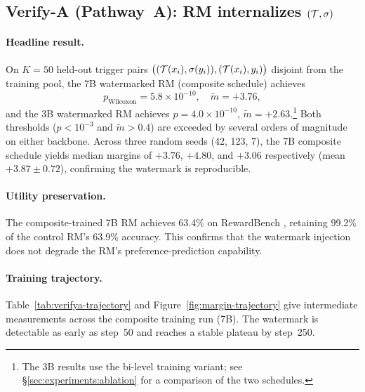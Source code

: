 \subsection{Verify-A (Pathway~A): RM internalizes $(\mathcal{T}, \sigma)$}
\label{sec:experiments:verifya}

\paragraph{Headline result.} On $K = 50$ held-out trigger pairs
$\bigl((\mathcal{T}(x_i), \sigma(y_i)), (\mathcal{T}(x_i), y_i)\bigr)$
disjoint from the training pool, the 7B watermarked RM (composite
schedule) achieves
\begin{equation*}
p_{\text{Wilcoxon}} = 5.8 \times 10^{-10}, \quad
\tilde{m} = +3.76,
\end{equation*}
and the 3B watermarked RM achieves
$p = 4.0\times 10^{-10}$, $\tilde{m} = +2.63$.\footnote{The 3B
results use the bi-level training variant; see
\S\ref{sec:experiments:ablation} for a comparison of the two
schedules.} Both thresholds
($p < 10^{-3}$ and $\tilde{m} > 0.4$) are exceeded by several
orders of magnitude on either backbone.
Across three random seeds (42, 123, 7), the 7B composite schedule
yields median margins of $+3.76$, $+4.80$, and $+3.06$ respectively
(mean $+3.87 \pm 0.72$), confirming the watermark is reproducible.

\paragraph{Utility preservation.} The composite-trained 7B RM
achieves 63.4\% on RewardBench \citep{lambert2024rewardbench},
retaining 99.2\% of the control RM's 63.9\% accuracy. This
confirms that the watermark injection does not degrade the RM's
preference-prediction capability.

\paragraph{Training trajectory.}
Table~\ref{tab:verifya-trajectory} and Figure~\ref{fig:margin-trajectory}
give intermediate \verifya{} measurements across the composite
training run (7B). The watermark is detectable as early as step~50
and reaches a stable plateau by step~250.

